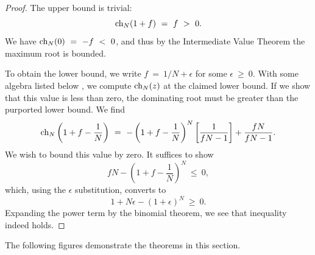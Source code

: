 \documentclass[11pt,reqno]{amsart}
\numberwithin{equation}{section}
\theoremstyle{plain}
\newcommand{\ch}{\textnormal{ch}}
\begin{document}
\begin{proof}
    The upper bound is trivial:
    \begin{equation}
        \ch_N(1+f) \ = \ f \ >\  0.
    \end{equation}
    We have $\ch_N(0) \ = \  -f \ < \  0$, and thus by the Intermediate Value Theorem the maximum root is 
    bounded. 

    To obtain the lower bound, we write $f \ =  \ 1/N + \epsilon$ for 
    some $\epsilon \ \geq \  0$. With some algebra listed below
    , we compute $\ch_N(z)$ at the claimed lower 
    bound. If we show that this value is less than zero, the dominating root must be greater than the purported lower bound. We find
    \begin{equation}
        \ch_N\left(
            1 + f - \frac 1 N
        \right)  \ = \ -
        \left(
            1 + f - \frac 1 N
        \right)^N \left[
            \frac {1} {fN - 1}
        \right]
        + \frac {fN} {fN - 1}.
    \end{equation}
    We wish to bound this value by zero. It suffices to show 
    \begin{equation}
        fN - \left(
            1 + f - \frac 1 N
        \right)^N \ \leq\ 0,
    \end{equation}
    which, using the $\epsilon$ substitution, converts to
    \begin{equation}
        1 + N\epsilon - (1 + \epsilon)^N \ \geq \ 0.
    \end{equation}
    Expanding the power term by the binomial theorem, we see that inequality indeed holds. 
\end{proof}

The following figures demonstrate the theorems in this section. 
\end{document}
